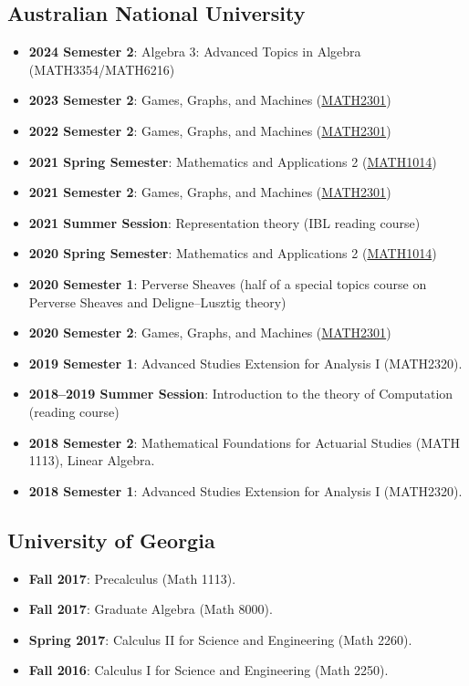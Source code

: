 \documentclass[a4paper]{moderncv}
\begin{document}
\subsection*{Australian National University}
\label{sec:orgf775309}
\begin{itemize}
\item \textbf{2024 Semester 2}: Algebra 3: Advanced Topics in Algebra (MATH3354/MATH6216)
\item \textbf{2023 Semester 2}: Games, Graphs, and Machines (\href{https://asilata.github.io/ggm/}{MATH2301})
\item \textbf{2022 Semester 2}: Games, Graphs, and Machines (\href{https://asilata.github.io/ggm/}{MATH2301})
\item \textbf{2021 Spring Semester}: Mathematics and Applications 2 (\href{https://programsandcourses.anu.edu.au/course/MATH1014}{MATH1014})
\item \textbf{2021 Semester 2}: Games, Graphs, and Machines (\href{https://asilata.github.io/ggm/}{MATH2301})
\item \textbf{2021 Summer Session}: Representation theory (IBL reading course)
\item \textbf{2020 Spring Semester}: Mathematics and Applications 2 (\href{https://programsandcourses.anu.edu.au/course/MATH1014}{MATH1014})
\item \textbf{2020 Semester 1}: Perverse Sheaves (half of a special topics course on Perverse Sheaves and Deligne--Lusztig theory)
\item \textbf{2020 Semester 2}: Games, Graphs, and Machines (\href{https://asilata.github.io/ggm/}{MATH2301})
\item \textbf{2019 Semester 1}: Advanced Studies Extension for Analysis I (MATH2320).
\item \textbf{2018–2019 Summer Session}: Introduction to the theory of Computation (reading course)
\item \textbf{2018 Semester 2}: Mathematical Foundations for Actuarial Studies (MATH 1113), Linear Algebra.
\item \textbf{2018 Semester 1}: Advanced Studies Extension for Analysis I (MATH2320).
\end{itemize}


\subsection*{University of Georgia}
\label{sec:orgbd9e709}
\begin{itemize}
\item \textbf{Fall 2017}: Precalculus (Math 1113).
\item \textbf{Fall 2017}: Graduate Algebra (Math 8000).
\item \textbf{Spring 2017}: Calculus II for Science and Engineering (Math 2260).
\item \textbf{Fall 2016}: Calculus I for Science and Engineering (Math 2250).
\end{itemize}
\end{document}
